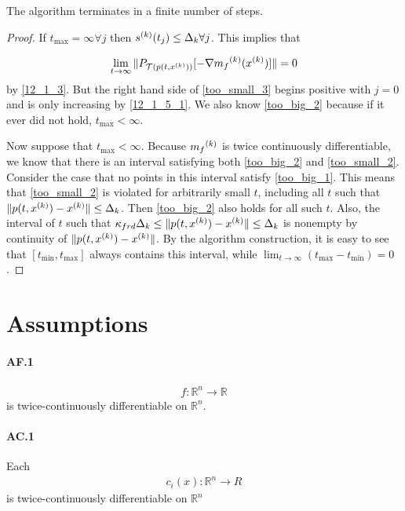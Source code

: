 \documentclass{article}
\begin{document}
\begin{theorem}
The algorithm terminates in a finite number of steps.
\end{theorem}

\begin{proof}
If $t_{\text{max}} = \infty \forall j$ then ${s}^{(k)}(t_j) \le  \Delta_k \forall j$.
This implies that

\[\lim_{t\to\infty}\|P_{\mathcal T(p(t,{x}^{(k)}))}[-\nabla {{m}_f}^{(k)}({x}^{(k)})]\| = 0\]
by \ref{12_1_3}.
But the right hand side of \ref{too_small_3} begins positive with $j=0$ and is only increasing by \ref{12_1_5_1}.
We also know \ref{too_big_2} because if it ever did not hold, $t_{\text{max}} < \infty$.

Now suppose that $t_{\text{max}} < \infty$.
Because ${{m}_f}^{(k)}$ is twice continuously differentiable, we know that there is an interval satisfying both \ref{too_big_2} and \ref{too_small_2}.
Consider the case that no points in this interval satisfy \ref{too_big_1}.
This means that \ref{too_small_2} is violated for arbitrarily small $t$, including all $t$ such that $\|p(t,{x}^{(k)})-{x}^{(k)}\| \le \Delta_k$.
Then \ref{too_big_2} also holds for all such $t$.
Also, the interval of $t$ such that $\kappa_{frd}\Delta_k \le \|p(t,{x}^{(k)}) - {x}^{(k)}\|\le \Delta_k$ is nonempty by continuity of $\|p(t,{x}^{(k)}) - {x}^{(k)}\|$.
By the algorithm construction, it is easy to see that $[t_{\text{min}}, t_{\text{max}}]$ always contains this interval, while $\lim_{t\to\infty}(t_{\text{max}} - t_{\text{min}}) = 0$.

\end{proof}

\appendix

\section{Assumptions}

\paragraph{AF.1}
\begin{align}
f: \mathbb R^n \to \mathbb R
\end{align}
is twice-continuously differentiable on $\mathbb R^n$.

\paragraph{AC.1}
Each
\begin{align}
c_i(x): \mathbb R^n \to R
\end{align}
is twice-continuously differentiable on $\mathbb R^n$
\end{document}
